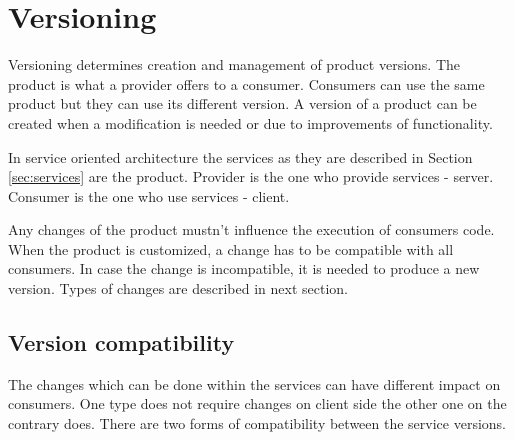 \chapter{Versioning}
\label{chap:versioning}

Versioning determines creation and management of product versions. The product is what a provider offers to a consumer. Consumers can use the same product but they can use its different version. A version of a product can be created when a modification is needed or due to improvements of functionality.

In service oriented architecture the services as they are described in Section \ref{sec:services} are the product. Provider is the one who provide services - server. Consumer is the one who use services - client.

Any changes of the product mustn't influence the execution of consumers code.
When the product is customized, a change has to be compatible with all consumers. In case the change is incompatible, it is needed to produce a new version. Types of changes are described in next section.


\section{Version compatibility}
\label{sec:v-compat}
The changes which can be done within the services can have different impact on consumers. One type does not require changes on client side the other one on the contrary does. There are two forms of compatibility between the service versions. \cite{website:service-versioning}


